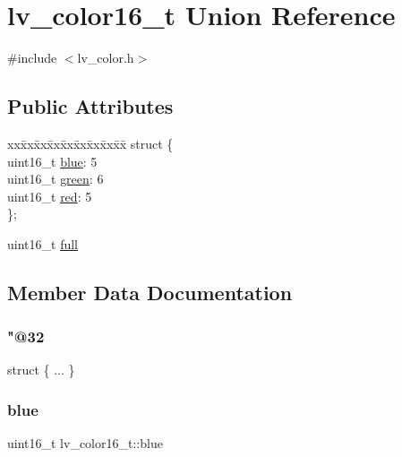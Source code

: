 \hypertarget{unionlv__color16__t}{}\section{lv\+\_\+color16\+\_\+t Union Reference}
\label{unionlv__color16__t}


{\ttfamily \#include $<$lv\+\_\+color.\+h$>$}

\subsection*{Public Attributes}
\begin{DoxyCompactItemize}
\item 
\begin{tabbing}
xx\=xx\=xx\=xx\=xx\=xx\=xx\=xx\=xx\=\kill
struct \{\\
\>uint16\_t \mbox{\hyperlink{unionlv__color16__t_a0c3cfa9a2070029d502140f5e23b8a46}{blue}}: 5\\
\>uint16\_t \mbox{\hyperlink{unionlv__color16__t_a229d888dcd846712eb78010a4938d39d}{green}}: 6\\
\>uint16\_t \mbox{\hyperlink{unionlv__color16__t_a0040e16563df0dd2d1f052e8cac9a980}{red}}: 5\\
\}; \\

\end{tabbing}\item 
uint16\+\_\+t \mbox{\hyperlink{unionlv__color16__t_a1ca6c661db8e7551e95792af824f6403}{full}}
\end{DoxyCompactItemize}


\subsection{Member Data Documentation}
\mbox{\label{unionlv__color16__t_ad9e989e1c380f90927e60cb9be79f803}} 
\subsubsection{\texorpdfstring{"@32}{@32}}
{\footnotesize\ttfamily struct \{ ... \} }

\mbox{\label{unionlv__color16__t_a0c3cfa9a2070029d502140f5e23b8a46}} 
\subsubsection{\texorpdfstring{blue}{blue}}
{\footnotesize\ttfamily uint16\+\_\+t lv\+\_\+color16\+\_\+t\+::blue}

